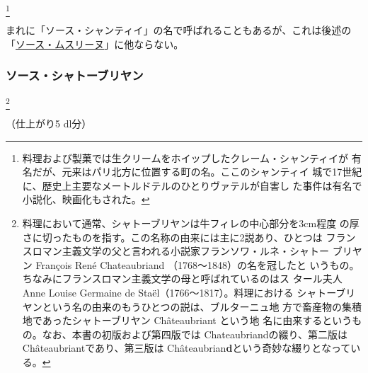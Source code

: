 \begin{recette}
\footnote{料理および製菓では生クリームをホイップしたクレーム・シャンティイが
  有名だが、元来はパリ北方に位置する町の名。ここのシャンティイ
  城で17世紀に、歴史上主要なメートルドテルのひとりヴァテルが自害し
  た事件は有名で小説化、映画化もされた。}


まれに「ソース・シャンティイ」の名で呼ばれることもあるが、これは後述の
「\protect\hyperlink{sauce-mousseline}{ソース・ムスリーヌ}」に他ならない。

\maeaki

\hypertarget{sauce-chateaubriand}{%
\subsubsection{ソース・シャトーブリヤン}\label{sauce-chateaubriand}}

\footnote{料理において通常、シャトーブリヤンは牛フィレの中心部分を3cm程度
  の厚さに切ったものを指す。この名称の由来には主に2説あり、ひとつは
  フランスロマン主義文学の父と言われる小説家フランソワ・ルネ・シャトー
  ブリヤン François René Chateaubriand （1768〜1848）の名を冠したと
  いうもの。ちなみにフランスロマン主義文学の母と呼ばれているのはス
  タール夫人Anne Louise Germaine de Staël（1766〜1817）。料理における
  シャトーブリヤンという名の由来のもうひとつの説は、ブルターニュ地
  方で畜産物の集積地であったシャトーブリヤン Châteaubriant という地
  名に由来するというもの。なお、本書の初版および第四版では
  Chateaubriandの綴り、第二版はChâteaubriantであり、第三版は
  Châteaubrian\textbf{d}という奇妙な綴りとなっている。}


（仕上がり5 dl分）


\end{recette}
